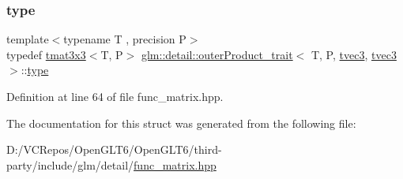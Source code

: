 \subsubsection{\texorpdfstring{type}{type}}
{\footnotesize\ttfamily template$<$typename T , precision P$>$ \\
typedef \mbox{\hyperlink{structglm_1_1tmat3x3}{tmat3x3}}$<$T, P$>$ \mbox{\hyperlink{structglm_1_1detail_1_1outer_product__trait}{glm\+::detail\+::outer\+Product\+\_\+trait}}$<$ T, P, \mbox{\hyperlink{structglm_1_1tvec3}{tvec3}}, \mbox{\hyperlink{structglm_1_1tvec3}{tvec3}} $>$\+::\mbox{\hyperlink{structglm_1_1detail_1_1outer_product__trait_3_01_t_00_01_p_00_01tvec3_00_01tvec3_01_4_ac6a4ba81935840a9b4e4603f0bc0e222}{type}}}



Definition at line 64 of file func\+\_\+matrix.\+hpp.



The documentation for this struct was generated from the following file\+:\begin{DoxyCompactItemize}
\item 
D\+:/\+V\+C\+Repos/\+Open\+G\+L\+T6/\+Open\+G\+L\+T6/third-\/party/include/glm/detail/\mbox{\hyperlink{func__matrix_8hpp}{func\+\_\+matrix.\+hpp}}\end{DoxyCompactItemize}
